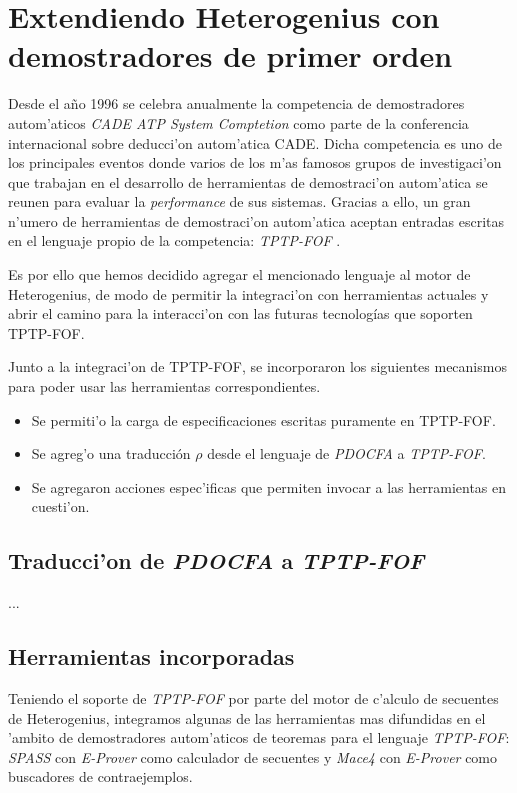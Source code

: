 \section{Extendiendo Heterogenius con demostradores de primer orden}

Desde el a\~no 1996 se celebra anualmente la competencia de demostradores autom'aticos \emph{CADE ATP System Comptetion} \cite{casc} como parte de la conferencia internacional sobre deducci'on autom'atica CADE.
Dicha competencia es uno de los principales eventos donde varios de los m'as famosos grupos de investigaci'on que trabajan en el desarrollo de herramientas de demostraci'on autom'atica se reunen para evaluar la \emph{performance} de sus sistemas.
Gracias a ello, un gran n'umero de herramientas de demostraci'on autom'atica aceptan entradas escritas en el lenguaje propio de la competencia: \textit{TPTP-FOF} \cite{fof}.

Es por ello que hemos decidido agregar el mencionado lenguaje al motor de Heterogenius, de modo de permitir la integraci'on con herramientas actuales y abrir el camino para la interacci'on con las futuras tecnologías que soporten TPTP-FOF.

Junto a la integraci'on de TPTP-FOF, se incorporaron los siguientes mecanismos para poder usar las herramientas correspondientes.

\begin{itemize}
\item Se permiti'o la carga de especificaciones escritas puramente en TPTP-FOF.

\item Se agreg'o una traducción $\rho$ desde el lenguaje de \textit{PDOCFA} a \textit{TPTP-FOF}. 

\item Se agregaron acciones espec'ificas que permiten invocar a las herramientas en cuesti'on.
\end{itemize}

\subsection{Traducci'on de \emph{PDOCFA} a \emph{TPTP-FOF}}

...

\subsection{Herramientas incorporadas}

Teniendo el soporte de \textit{TPTP-FOF} por parte del motor de c'alculo de secuentes de Heterogenius, integramos algunas de las herramientas mas difundidas en el 'ambito de demostradores autom'aticos de teoremas para el lenguaje \textit{TPTP-FOF}: \textit{SPASS} \cite{WDFKSW09} con \textit{E-Prover} \cite{s13} como calculador de secuentes y \textit{Mace4} \cite{m05} con \textit{E-Prover} como buscadores de contraejemplos.

